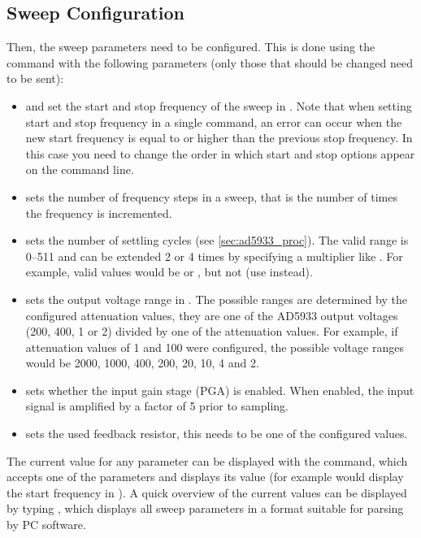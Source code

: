 \subsection{Sweep Configuration}

Then, the sweep parameters need to be configured. This is done using the  command with the following
parameters (only those that should be changed need to be sent):
\begin{itemize}
	\item {} and  set the start and stop frequency of the sweep in \hertz.
    Note that when setting start and stop frequency in a single command, an error can occur when the new start
    frequency is equal to or higher than the previous stop frequency. In this case you need to change the order in
    which start and stop options appear on the command line.
  \item {} sets the number of frequency steps in a sweep, that is the number of times the frequency
    is incremented.
  \item {} sets the number of settling cycles (see \autoref{sec:ad5933_proc}). The valid range is
    0--511 and can be extended 2 or 4 times by specifying a multiplier like . For example, valid values
    would be  or , but not  (use  instead).
  \item {} sets the output voltage range in \milli\volt. The possible ranges are determined by
    the configured attenuation values, they are one of the AD5933 output voltages (\unit{200}{\milli\volt},
    \unit{400}{\milli\volt}, \unit{1}{\volt} or \unit{2}{\volt}) divided by one of the attenuation values. For example,
    if attenuation values of 1 and 100 were configured, the possible voltage ranges would be 2000, 1000, 400, 200, 20,
    10, 4 and 2.
  \item {} sets whether the input gain stage (PGA) is enabled. When enabled, the input signal is
    amplified by a factor of 5 prior to sampling.
  \item {} sets the used feedback resistor, this needs to be one of the configured values.
\end{itemize}
The current value for any parameter can be displayed with the  command, which accepts one of the
parameters and displays its value (for example  would display the start frequency in \hertz).
A quick overview of the current values can be displayed by typing , which displays all sweep
parameters in a format suitable for parsing by PC software.

